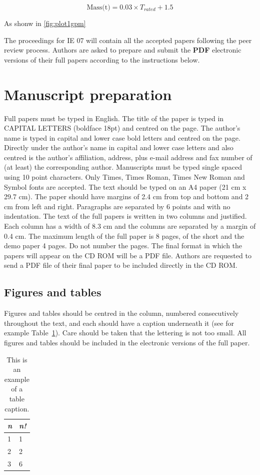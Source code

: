 \documentclass{article}
\begin{document}
\begin{equation}
  \text{Mass(t)} = 0.03 \times {T_{rated}} + 1.5
\end{equation}

As shonw in \autoref{fig:plot1gpm}

The proceedings for IE 07 will contain all the accepted
papers following the peer review process. Authors are
asked to prepare and submit the {\bf PDF} electronic versions
of their full papers according to the instructions below.

\section{Manuscript preparation}
Full papers must be typed in English. The title of the
paper is typed in CAPITAL LETTERS (boldface 18pt)
and centred on the page. The author's name is typed in
capital and lower case bold letters and centred on the
page. Directly under the author's name in capital and
lower case letters and also centred is the author's
affiliation, address, plus e-mail address and fax number of
(at least) the corresponding author. Manuscripts must be
typed single spaced using 10 point characters. Only
Times, Times Roman, Times New Roman and Symbol
fonts are accepted. The text should be typed on an A4
paper (21 cm x 29.7 cm). The paper should have margins
of 2.4 cm from top and bottom and 2 cm from left and
right. Paragraphs are separated by 6 points and with no
indentation. The text of the full papers is written in two
columns and justified. Each column has a width of 8.3 cm
and the columns are separated by a margin of 0.4 cm. The
maximum length of the full paper is 8 pages, of the short
and the demo paper 4 pages. Do not number the pages.
The final format in which the papers will appear on the
CD ROM will be a PDF file. Authors are requested to send
a PDF file of their final paper to be included directly
in the CD ROM.

\subsection{Figures and tables}
Figures and tables should be centred in the column,
numbered consecutively throughout the text, and each
should have a caption underneath it (see for example
Table~\ref{tab1}). Care should be taken that the lettering
is not too small. All figures and tables should be included
in the electronic versions of the full paper.


\begin{table}[htb!]
\begin{center}

\begin{tabular}{|l|l|}
\hline
{\em n} & {\em n!} \\
\hline
1 & 1  \\
2 & 2  \\
3  & 6\\
\hline
\end{tabular}
\end{center}
\caption{\label{tab1}This is an example of a table caption.}
\end{table}
\end{document}
